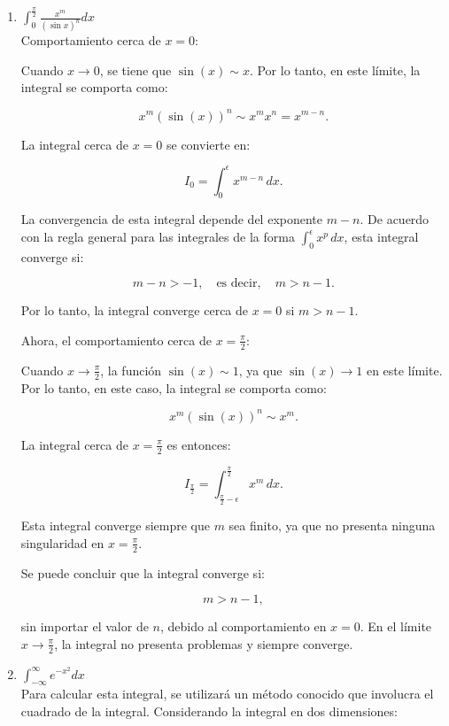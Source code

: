 \documentclass{article}
\begin{document}
\begin{enumerate}
\begin{enumerate}
La integral en \( x \to 0 \) presenta una divergencia debido a la singularidad del término \( \frac{1}{x \log(x)} \). Por lo tanto la integral diverge.

		\item $ \int_{0}^{\frac{\pi}{2}} \frac{x^m}{(\sin x)^n}dx $
\[\]        
Comportamiento cerca de \( x = 0 \):

Cuando \( x \to 0 \), se tiene que \( \sin(x) \sim x \). Por lo tanto, en este límite, la integral se comporta como:

\[
x^m (\sin(x))^n \sim x^m x^n = x^{m - n}.
\]

La integral cerca de \( x = 0 \) se convierte en:

\[
I_0 = \int_0^\epsilon x^{m - n} \, dx.
\]

La convergencia de esta integral depende del exponente \( m - n \). De acuerdo con la regla general para las integrales de la forma \( \int_0^\epsilon x^p \, dx \), esta integral converge si:

\[
m - n > -1, \quad \text{es decir}, \quad m > n - 1.
\]

Por lo tanto, la integral converge cerca de \( x = 0 \) si \( m > n - 1 \).

Ahora, el comportamiento cerca de \( x = \frac{\pi}{2} \):

Cuando \( x \to \frac{\pi}{2} \), la función \( \sin(x) \sim 1 \), ya que \( \sin(x) \to 1 \) en este límite. Por lo tanto, en este caso, la integral se comporta como:

\[
x^m (\sin(x))^n \sim x^m.
\]

La integral cerca de \( x = \frac{\pi}{2} \) es entonces:

\[
I_{\frac{\pi}{2}} = \int_{\frac{\pi}{2} - \epsilon}^{\frac{\pi}{2}} x^m \, dx.
\]

Esta integral converge siempre que \( m \) sea finito, ya que no presenta ninguna singularidad en \( x = \frac{\pi}{2} \).

Se puede concluir que la integral converge si:

\[
m > n - 1,
\]

sin importar el valor de \( n \), debido al comportamiento en \( x = 0 \). En el límite \( x \to \frac{\pi}{2} \), la integral no presenta problemas y siempre converge.

		\item $ \int_{-\infty}^{\infty} e^{-x^2}dx $
\[\]
Para calcular esta integral, se utilizará un método conocido que involucra el cuadrado de la integral. Considerando la integral en dos dimensiones:


\end{enumerate}
\end{enumerate}
\end{document}
